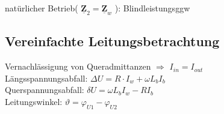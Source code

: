 \documentclass[6pt,a4paper]{scrartcl}
\renewcommand{\vec}[1]{\ensuremath{\underline{\boldsymbol {#1}}}}
\newcommand{\Ra}[0]{\ensuremath{\Rightarrow}}									%
\begin{document}
\begin{multicols}{4}
	natürlicher Betrieb( $\vec Z_2 = \vec Z_w$ ): Blindleistungsggw\\


	\subsection{Vereinfachte Leitungsbetrachtung}
	Vernachlässigung von Queradmittanzen $\Ra$ $I_{in} = I_{out}$\\
	Längsspannungsabfall: $\Delta U = R \cdot I_w + \omega L_b I_b$\\
	Querspannungsabfall: $\delta U = \omega L_b I_w - R I_b$\\
	Leitungswinkel: $\vartheta = \varphi_{U1} - \varphi_{U2}$\\












\end{multicols}

\end{document}

